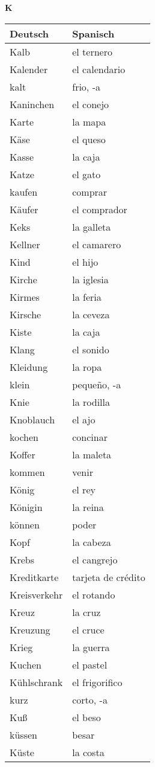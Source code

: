 \begin{flushright}\begin{Huge}\textbf{K}\end{Huge}\end{flushright}

\begin{longtable}{p{} p{}} 
\textbf{Deutsch}     & \textbf{Spanisch}                                       \\ \hline
\hline
\endhead %
Kalb & el ternero\\
Kalender & el calendario\\
kalt & frio, -a\\
Kaninchen & el conejo\\
Karte & la mapa\\
Käse & el queso\\
Kasse & la caja\\
Katze & el gato \\
kaufen & comprar\\
Käufer & el comprador\\
Keks & la galleta\\
Kellner & el camarero\\
Kind & el hijo\\
Kirche & la iglesia\\
Kirmes & la feria\\
Kirsche & la ceveza\\
Kiste & la caja\\
Klang & el sonido\\
Kleidung & la ropa\\
klein & pequeño, -a\\
Knie & la rodilla\\
Knoblauch & el ajo\\
kochen & concinar\\
Koffer & la maleta\\
kommen & venir \\
König & el rey\\
Königin & la reina\\
können & poder\\
Kopf & la cabeza\\
Krebs & el cangrejo\\
Kreditkarte & tarjeta de crédito\\
Kreisverkehr & el rotando\\
Kreuz & la cruz\\
Kreuzung & el cruce\\
Krieg & la guerra\\
Kuchen & el pastel\\
Kühlschrank & el frigorifico\\
kurz & corto, -a\\
Kuß & el beso\\
küssen & besar\\
Küste & la costa\\
\end{longtable}
